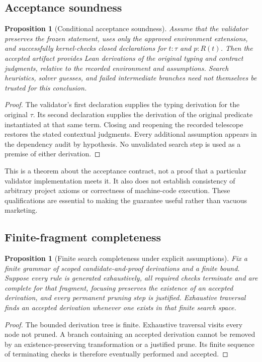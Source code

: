 \documentclass[11pt,a4paper]{article}
\newtheorem{proposition}[definition]{Proposition}
\theoremstyle{remark}
\begin{document}
\subsection{Acceptance soundness}

\begin{proposition}[Conditional acceptance soundness]
Assume that the validator preserves the frozen statement, uses only the approved environment extensions, and successfully kernel-checks closed declarations for $t:\tau$ and $p:R(t)$. Then the accepted artifact provides Lean derivations of the original typing and contract judgments, relative to the recorded environment and assumptions. Search heuristics, solver guesses, and failed intermediate branches need not themselves be trusted for this conclusion.
\end{proposition}
\begin{proof}
The validator's first declaration supplies the typing derivation for the original $\tau$. Its second declaration supplies the derivation of the original predicate instantiated at that same term. Closing and reopening the recorded telescope restores the stated contextual judgments. Every additional assumption appears in the dependency audit by hypothesis. No unvalidated search step is used as a premise of either derivation.
\end{proof}

This is a theorem about the acceptance contract, not a proof that a particular validator implementation meets it. It also does not establish consistency of arbitrary project axioms or correctness of machine-code execution. These qualifications are essential to making the guarantee useful rather than vacuous marketing.

\subsection{Finite-fragment completeness}

\begin{proposition}[Finite search completeness under explicit assumptions]
Fix a finite grammar of scoped candidate-and-proof derivations and a finite bound. Suppose every rule is generated exhaustively, all required checks terminate and are complete for that fragment, focusing preserves the existence of an accepted derivation, and every permanent pruning step is justified. Exhaustive traversal finds an accepted derivation whenever one exists in that finite search space.
\end{proposition}
\begin{proof}
The bounded derivation tree is finite. Exhaustive traversal visits every node not pruned. A branch containing an accepted derivation cannot be removed by an existence-preserving transformation or a justified prune. Its finite sequence of terminating checks is therefore eventually performed and accepted.
\end{proof}
\end{document}
